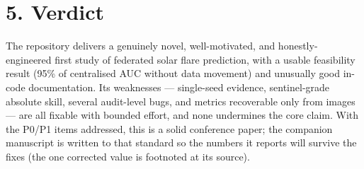 \documentclass[11pt,a4paper]{article}
\begin{document}
\section*{5. Verdict}

The repository delivers a genuinely novel, well-motivated, and
honestly-engineered first study of federated solar flare prediction,
with a usable feasibility result (95\% of centralised AUC without data
movement) and unusually good in-code documentation. Its weaknesses ---
single-seed evidence, sentinel-grade absolute skill, several
audit-level bugs, and metrics recoverable only from images --- are all
fixable with bounded effort, and none undermines the core claim. With
the P0/P1 items addressed, this is a solid conference paper; the
companion manuscript is written to that standard so the numbers it
reports will survive the fixes (the one corrected value is footnoted
at its source).
\end{document}
